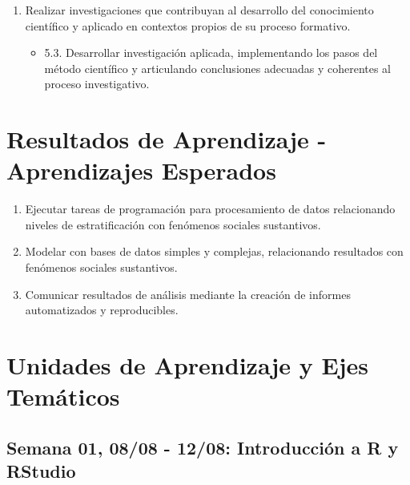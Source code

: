 \documentclass[11pt,letter,]{article}
\providecommand{\tightlist}{%
  \setlength{\itemsep}{0pt}\setlength{\parskip}{0pt}}
\begin{document}
\begin{enumerate}
\def\labelenumi{\arabic{enumi}.}
\setcounter{enumi}{4}
\tightlist
\item
  Realizar investigaciones que contribuyan al desarrollo del
  conocimiento científico y aplicado en contextos propios de su proceso
  formativo.

  \begin{itemize}
  \tightlist
  \item
    5.3. Desarrollar investigación aplicada, implementando los pasos del
    método científico y articulando conclusiones adecuadas y coherentes
    al proceso investigativo.
  \end{itemize}
\end{enumerate}

\hypertarget{resultados-de-aprendizaje---aprendizajes-esperados}{%
\section{Resultados de Aprendizaje - Aprendizajes
Esperados}\label{resultados-de-aprendizaje---aprendizajes-esperados}}

\begin{enumerate}
\def\labelenumi{\arabic{enumi}.}
\tightlist
\item
  Ejecutar tareas de programación para procesamiento de datos
  relacionando niveles de estratificación con fenómenos sociales
  sustantivos.
\item
  Modelar con bases de datos simples y complejas, relacionando
  resultados con fenómenos sociales sustantivos.
\item
  Comunicar resultados de análisis mediante la creación de informes
  automatizados y reproducibles.
\end{enumerate}

\hypertarget{unidades-de-aprendizaje-y-ejes-temuxe1ticos}{%
\section{Unidades de Aprendizaje y Ejes
Temáticos}\label{unidades-de-aprendizaje-y-ejes-temuxe1ticos}}

\hypertarget{semana-01-0808---1208-introducciuxf3n-a-r-y-rstudio}{%
\subsection{Semana 01, 08/08 - 12/08: Introducción a R y
RStudio}\label{semana-01-0808---1208-introducciuxf3n-a-r-y-rstudio}}
\end{document}
